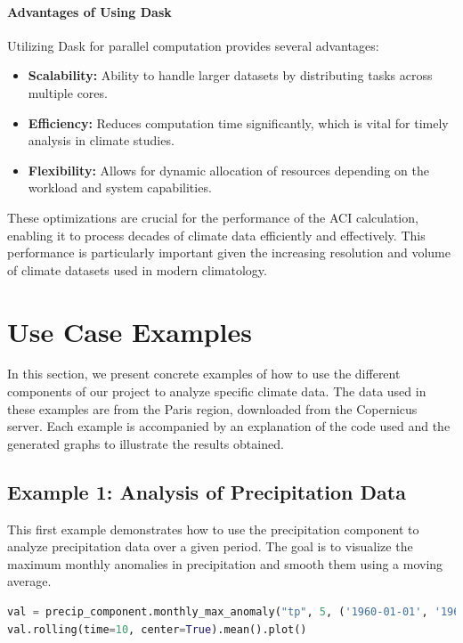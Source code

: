 \documentclass[a4paper,12pt]{article}
\begin{document}
\paragraph{Advantages of Using Dask}
Utilizing Dask for parallel computation provides several advantages:
\begin{itemize}
    \item \textbf{Scalability:} Ability to handle larger datasets by distributing tasks across multiple cores.
    \item \textbf{Efficiency:} Reduces computation time significantly, which is vital for timely analysis in climate studies.
    \item \textbf{Flexibility:} Allows for dynamic allocation of resources depending on the workload and system capabilities.
\end{itemize}

These optimizations are crucial for the performance of the ACI calculation, enabling it to process decades of climate data efficiently and effectively. This performance is particularly important given the increasing resolution and volume of climate datasets used in modern climatology.

\section{Use Case Examples}

In this section, we present concrete examples of how to use the different components of our project to analyze specific climate data. The data used in these examples are from the Paris region, downloaded from the Copernicus server. Each example is accompanied by an explanation of the code used and the generated graphs to illustrate the results obtained.

\subsection{Example 1: Analysis of Precipitation Data}

This first example demonstrates how to use the precipitation component to analyze precipitation data over a given period. The goal is to visualize the maximum monthly anomalies in precipitation and smooth them using a moving average.

\begin{lstlisting}[language=Python]
val = precip_component.monthly_max_anomaly("tp", 5, ('1960-01-01', '1964-12-31'), True)
val.rolling(time=10, center=True).mean().plot()
\end{lstlisting}
\end{document}
